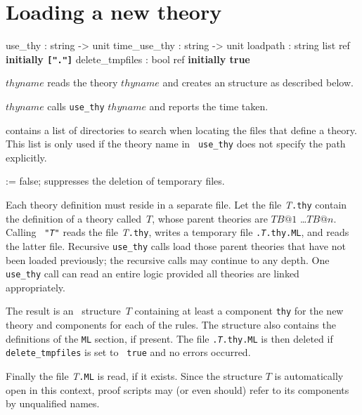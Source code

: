 \section{Loading a new theory}\label{LoadingTheories}
\begin{ttbox}
use_thy         : string -> unit
time_use_thy    : string -> unit
loadpath        : string list ref \hfill{\bf initially {\tt["."]}}
delete_tmpfiles : bool ref \hfill{\bf initially true}
\end{ttbox}

\begin{ttdescription}
\item[\ttindexbold{use_thy} $thyname$]
  reads the theory $thyname$ and creates an \ML{} structure as described below.

\item[\ttindexbold{time_use_thy} $thyname$]
  calls {\tt use_thy} $thyname$ and reports the time taken.

\item[\ttindexbold{loadpath}]
  contains a list of directories to search when locating the files that
  define a theory.  This list is only used if the theory name in {\tt
    use_thy} does not specify the path explicitly.

\item[\ttindexbold{delete_tmpfiles} := false;]
suppresses the deletion of temporary files.
\end{ttdescription}
%
Each theory definition must reside in a separate file.  Let the file
{\it T}{\tt.thy} contain the definition of a theory called~$T$, whose
parent theories are $TB@1$ \dots $TB@n$.  Calling
~{\tt"{\it T\/}"} reads the file {\it T}{\tt.thy},
writes a temporary \ML{} file {\tt.{\it T}.thy.ML}, and reads the
latter file.  Recursive {\tt use_thy} calls load those parent theories
that have not been loaded previously; the recursive calls may continue
to any depth.  One {\tt use_thy} call can read an entire logic
provided all theories are linked appropriately.

The result is an \ML\ structure~$T$ containing at least a component {\tt thy}
for the new theory and components for each of the rules.  The structure also
contains the definitions of the {\tt ML} section, if present.  The file
{\tt.{\it T}.thy.ML} is then deleted if {\tt delete_tmpfiles} is set to {\tt
true} and no errors occurred.

Finally the file {\it T}{\tt.ML} is read, if it exists.  Since the
structure $T$ is automatically open in this context, proof scripts may
(or even should) refer to its components by unqualified names.

